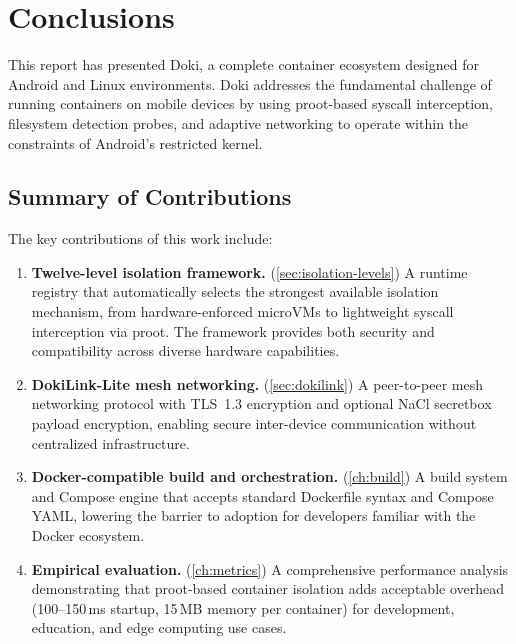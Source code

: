 \chapter{Conclusions}
\label{ch:conclusions}

This report has presented Doki, a complete container ecosystem designed
for Android and Linux environments. Doki addresses the fundamental
challenge of running containers on mobile devices by using proot-based
syscall interception, filesystem detection probes, and adaptive
networking to operate within the constraints of Android's restricted
kernel.

\section{Summary of Contributions}
\label{sec:contributions-summary}

The key contributions of this work include:

\begin{enumerate}[leftmargin=*, itemsep=4pt]
  \item \textbf{Twelve-level isolation framework.}
        (\cref{sec:isolation-levels}) A runtime registry that
        automatically selects the strongest available isolation
        mechanism, from hardware-enforced microVMs to lightweight
        syscall interception via proot. The framework provides both
        security and compatibility across diverse hardware
        capabilities.

  \item \textbf{DokiLink-Lite mesh networking.}
        (\cref{sec:dokilink}) A peer-to-peer mesh networking protocol
        with TLS~1.3 encryption and optional NaCl secretbox payload
        encryption, enabling secure inter-device communication without
        centralized infrastructure.

  \item \textbf{Docker-compatible build and orchestration.}
        (\cref{ch:build}) A build system and Compose engine
        that accepts standard Dockerfile syntax and Compose YAML,
        lowering the barrier to adoption for developers familiar with
        the Docker ecosystem.

  \item \textbf{Empirical evaluation.}
        (\cref{ch:metrics}) A comprehensive performance analysis
        demonstrating that proot-based container isolation adds
        acceptable overhead (100--150\,ms startup, 15\,MB memory per
        container) for development, education, and edge computing use
        cases.
\end{enumerate}

